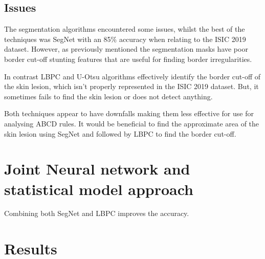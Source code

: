 \subsection{Issues}
The segmentation algorithms encountered some issues, whilst the best of the techniques was SegNet with an 85\% accuracy when relating to the ISIC 2019 dataset. However, as previously mentioned the segmentation masks have poor border cut-off stunting features that are useful for finding border irregularities. 

In contrast LBPC and U-Otsu algorithms effectively identify the border cut-off of the skin lesion, which isn't properly represented in the ISIC 2019 dataset. But, it sometimes fails to find the skin lesion or does not detect anything. 

Both techniques appear to have downfalls making them less effective for use for analysing ABCD rules. It would be beneficial to find the approximate area of the skin lesion using SegNet and followed by LBPC to find the border cut-off.

\section{Joint Neural network and statistical model approach}


Combining both SegNet and LBPC improves the accuracy. 

\section{Results}

